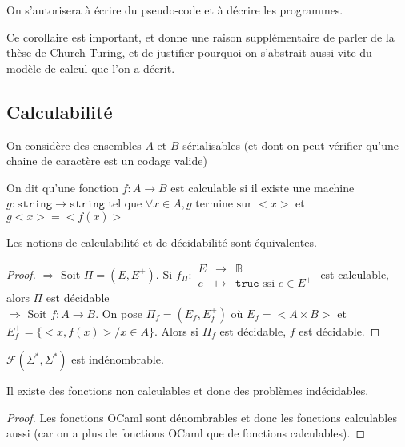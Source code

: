 \begin{corollary}
	On s'autorisera à écrire du pseudo-code et à décrire les programmes.
\end{corollary}

\begin{com}
	Ce corollaire est important, et donne une raison supplémentaire de parler de la thèse de Church Turing, et de justifier pourquoi on s'abstrait aussi vite du modèle de calcul que l'on a décrit.
\end{com}

\subsection{Calculabilité}

On considère des ensembles $A$ et $B$ sérialisables (et dont on peut vérifier qu'une chaine de caractère est un codage valide)

\begin{definition}
	On dit qu'une fonction $f : A \to B$  est calculable si il existe une machine $g : \texttt{string} \to  \texttt{string}$ tel que $\forall x\in A, g \text{ termine sur }<x>$ et $g <x> = <f(x)>$
\end{definition}

\begin{principe}
	Les notions de calculabilité et de décidabilité sont équivalentes.
\end{principe}

\begin{proof}
	$\boxed{\Rightarrow}$ Soit $\Pi = (E, E^+)$. Si $f_\Pi :$$\begin{array}{ccl}
		E & \to & \mathbb B\\
		e & \mapsto & \texttt{true} \text{ ssi } e\in E^+
	\end{array}$ est calculable, alors $\Pi$ est décidable\\
	
	$\boxed{\Rightarrow}$ Soit $f : A \to B$. On pose $\Pi_f = (E_f, E_f^+)$ où $E_f = <A\times B>$ et $E_f^+ = \{<x, f(x)> / x \in A\}$. Alors si $\Pi_f$ est décidable, $f$ est décidable.
\end{proof}

\begin{proposition}
	$\mathcal F(\Sigma^*, \Sigma^*)$ est indénombrable.
\end{proposition}

\begin{corollary}
	Il existe des fonctions non calculables et donc des problèmes indécidables.
\end{corollary}
\begin{proof}
	Les fonctions OCaml sont dénombrables et donc les fonctions calculables aussi (car on a plus de fonctions OCaml que de fonctions calculables).
\end{proof}

